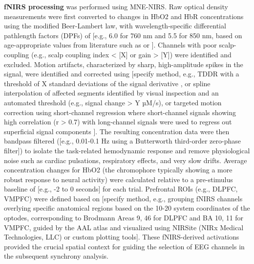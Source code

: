 \textbf{\gls{fNIRS} processing} was performed using MNE-NIRS. Raw optical density measurements were first converted to changes in \gls{HbO2} and \gls{HbR} concentrations using the modified Beer-Lambert law, with wavelength-specific differential pathlength factors (DPFs) of [e.g., 6.0 for 760 nm and 5.5 for 850 nm, based on age-appropriate values from literature such as \textcite{scholkmannReviewContinuousWave2014} or \textcite{delpyEstimationOpticalPathlength1988}]. Channels with poor scalp-coupling (e.g., scalp coupling index < [X] or gain > [Y]) were identified and excluded. Motion artifacts, characterized by sharp, high-amplitude spikes in the signal, were identified and corrected using [specify method, e.g., \gls{TDDR} with a threshold of X standard deviations of the signal derivative \parencite{scholkmannReviewContinuousWave2014}, or spline interpolation of affected segments identified by visual inspection and an automated threshold (e.g., signal change > Y µM/s), or targeted motion correction using short-channel regression where short-channel signals showing high correlation (r > 0.7) with long-channel signals were used to regress out superficial signal components \parencite{gagnonShortSeparationChannel2012}]. The resulting concentration data were then bandpass filtered ([e.g., 0.01-0.1 Hz using a Butterworth third-order zero-phase filter]) to isolate the task-related hemodynamic response and remove physiological noise such as cardiac pulsations, respiratory effects, and very slow drifts. Average concentration changes for \gls{HbO2} (the chromophore typically showing a more robust response to neural activity) were calculated relative to a pre-stimulus baseline of [e.g., -2 to 0 seconds] for each trial. Prefrontal \gls{ROI}s (e.g., \gls{DLPFC}, \gls{VMPFC}) were defined based on [specify method, e.g., grouping fNIRS channels overlying specific anatomical regions based on the 10-20 system coordinates of the optodes, corresponding to Brodmann Areas 9, 46 for DLPFC and BA 10, 11 for VMPFC, guided by the AAL atlas \parencite{tzourio-mazoyerAutomatedAnatomicalLabeling2002} and visualized using NIRSite (NIRx Medical Technologies, LLC) or custom plotting tools]. These \gls{fNIRS}-derived activations provided the crucial spatial context for guiding the selection of \gls{EEG} channels in the subsequent synchrony analysis.

